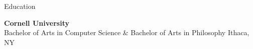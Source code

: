 
\begin{rSection}{Education}

	{\bf \large{Cornell University}} \hfill \color{darkgray}{2021 - 2025}
	\\ 
	Bachelor of Arts in Computer Science \& Bachelor of Arts in Philosophy \hfill Ithaca, NY
	
	\color{black}

\end{rSection}